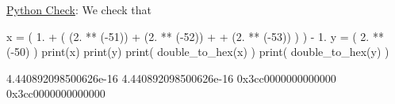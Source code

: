 \documentclass[pdftex,11pt]{article}
\begin{document}
\begin{enumerate}
\underline{Python Check}: We check that

\begin{python}
x = ( 1. + ( (2. ** (-51)) + (2. ** (-52)) +  + (2. ** (-53)) ) ) - 1.
y = ( 2. ** (-50) )
print(x)
print(y)
print( double_to_hex(x) )
print( double_to_hex(y) )
\end{python}
\begin{pythonoutput}
4.440892098500626e-16
4.440892098500626e-16
0x3cc0000000000000
0x3cc0000000000000
\end{pythonoutput}

\begin{comment}
\underline{Matlab Check}: We check that
\begin{verbatim}
( (1 + (2^(-51) + 2^(-52) + 2^(-53))) - 1 ) - 2^(-50)
\end{verbatim}
is exactly
\begin{verbatim}
0
\end{verbatim}
\end{comment}





\end{enumerate}
\end{document}
